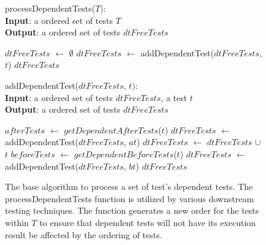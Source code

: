 \begin{figure}[t]
	processDependentTests($\mathit{T}):$\\
	\textbf{Input}: a ordered set of tests $\mathit{T}$\\
	\textbf{Output}: a ordered set of tests $\mathit{dtFreeTests}$\\
	\vspace{-5mm}
	\begin{algorithmic}[1]
		\STATE $\mathit{dtFreeTests}$ $\leftarrow$ $\emptyset$
			\STATE $\mathit{dtFreeTests}$ $\leftarrow$
			addDependentTest($\mathit{dtFreeTests}$, $\mathit{t}$)	
		\ENDFOR
		\RETURN $\mathit{dtFreeTests}$
	\end{algorithmic}

	addDependentTest($\mathit{dtFreeTests}$, $\mathit{t}):$\\
	\textbf{Input}: a ordered set of tests $\mathit{dtFreeTests}$,
	a test $\mathit{t}$\\
	\textbf{Output}: a ordered set of tests $\mathit{dtFreeTests}$\\
	\vspace{-5mm}
	\begin{algorithmic}[1]
			\STATE $\mathit{afterTests}$ $\leftarrow$
			$\mathit{getDependentAfterTests}$($\mathit{t}$)
				\STATE $\mathit{dtFreeTests}$ $\leftarrow$
				addDependentTest($\mathit{dtFreeTests}$, $\mathit{at}$)
			\ENDFOR
			\STATE $\mathit{dtFreeTests}$ $\leftarrow$ $\mathit{dtFreeTests}$
			$\cup$ $\mathit{t}$
			\STATE $\mathit{beforeTests}$ $\leftarrow$
			$\mathit{getDependentBeforeTests}$($\mathit{t}$)
				\STATE $\mathit{dtFreeTests}$ $\leftarrow$
				addDependentTest($\mathit{dtFreeTests}$, $\mathit{bt}$)
			\ENDFOR
		\ENDIF
		\RETURN $\mathit{dtFreeTests}$
	\end{algorithmic}
	\vspace{-3mm}
	\caption {
		The base algorithm to process a set of test's dependent tests. The
		 processDependentTests function is utilized by various downstream
		 testing techniques. The function generates a new order for the tests
		 within $\mathit{T}$ to ensure that dependent tests will not have its
		 execution result be affected by the ordering of tests. 
	}
	\label{fig:processDT}
\end{figure}

